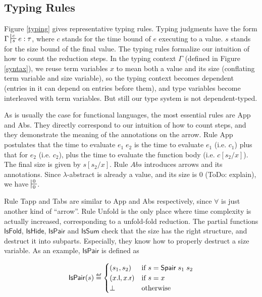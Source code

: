 \documentclass[preprint]{sigplanconf}
\newcommand{\typing}[4]{\sststile{#4}{#3}#1:#2}
\newcommand{\syml}{\mathsf{l}}
\newcommand{\symr}{\mathsf{r}}
\newcommand{\symSpair}{\mathsf{Spair}}
\newcommand\defeq{\mathrel{\overset{\makebox[0pt]{\mbox{\normalfont\tiny\sffamily def}}}{=}}}
\begin{document}
\subsection{Typing Rules}

Figure \ref{typing} gives representative typing rules. Typing judgments have the form $\Gamma\typing{e}{\tau}{c}{s}$, where $c$ stands for the time bound of $e$ executing to a value. $s$ stands for the size bound of the final value. The typing rules formalize our intuition of how to count the reduction steps. In the typing context $\Gamma$ (defined in Figure \ref{syntax}), we reuse term variables $x$ to mean both a value and its size (conflating term variable and size variable), so the typing context becomes dependent (entries in it can depend on entries before them), and type variables become interleaved with term variables. But still our type system is not dependent-typed.

As is usually the case for functional languages, the most essential rules are {\sc App} and {\sc Abs}. They directly correspond to our intuition of how to count steps, and they demonstrate the meaning of the annotations on the arrow. Rule {\sc App} postulates that the time to evaluate $e_1\;e_2$ is the time to evaluate $e_1$ (i.e. $c_1$) plus that for $e_2$ (i.e. $c_2$), plus the time to evaluate the function body (i.e. $c[s_2/x]$). The final size is given by $s[s_2/x]$. Rule $Abs$ introduces arrows and its annotations. Since $\lambda$-abstract is already a value, and its size is 0 (ToDo: explain), we have $\turnstile{s}{s}{0}{0}{n}$.

Rule {\sc Tapp} and {\sc Tabs} are similar to {\sc App} and {\sc Abs} respectively, since $\forall$ is just another kind of ``arrow''. Rule {\sc Unfold} is the only place where time complexity is actually increased, corresponding to a unfold-fold reduction. The partial functions $\mathsf{IsFold}$, $\mathsf{IsHide}$, $\mathsf{IsPair}$ and $\mathsf{IsSum}$ check that the size has the right structure, and destruct it into subparts. Especially, they know how to properly destruct a size variable. As an example, $\mathsf{IsPair}$ is defined as

$$
\mathsf{IsPair}(s)\defeq\begin{cases}
(s_1, s_2) & \mbox{if } s = \symSpair\;s_1\;s_2 \\
(x.\syml, x.\symr) & \mbox{if } s = x \\
\bot & \mbox{otherwise}\\
\end{cases}
$$
\end{document}
